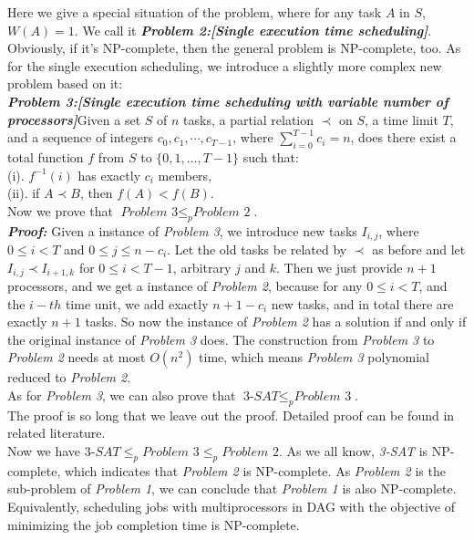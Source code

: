 \documentclass{llncs}
\begin{document}
\indent\setlength{\parindent}{2em}Here we give a special situation of the problem, where for any task $A$ in $S$, $W(A)=1$. We call it
\textbf{\textit{Problem 2:[Single execution time scheduling]}}. Obviously, if it’s NP-complete, then the general problem is NP-complete, too. As for the single execution scheduling, we introduce a slightly more complex new problem based on it:\\
\indent\setlength{\parindent}{2em}\textbf{\textit{Problem 3:[Single execution time scheduling with variable number of processors]}}Given a set $S$ of $n$ tasks, a partial relation $\prec$ on $S$, a time limit $T$, and a sequence of integers $c_0,c_1,\cdots,c_{T-1}$, where $\sum\limits_{i=0}^{T-1}c_i=n$, does there exist a total function $f$ from $S$ to $\{0, 1, ..., T-1\}$ such that:\\
\indent\setlength{\parindent}{2em}(i). $f^{-1}(i)$ has exactly $c_i$ members,\\
\indent\setlength{\parindent}{2em}(ii). if $A\prec B$, then $f(A)<f(B)$.\\
\indent\setlength{\parindent}{2em}Now we prove that $\textit{Problem 3}\leq _p\textit{Problem 2}$.\\
\indent\setlength{\parindent}{2em}\textbf{\textit{Proof: }} Given a instance of \textit{Problem 3}, we introduce new tasks $I_{i,j}$, where $0\leqslant i<T$ and $0\leqslant j\leqslant n-c_i$. Let the old tasks be related by $\prec$ as before and let $I_{i,j}\prec I_{i+1,k}$ for $0\leqslant i<T-1$, arbitrary $j$ and $k$. Then we just provide $n+1$ processors, and we get a instance of \textit{Problem 2}, because for any $0\leqslant i<T$, and the $i-th$ time unit, we add exactly $n+1-c_i$ new tasks, and in total there are exactly $n+1$ tasks. So now the instance of \textit{Problem 2} has a solution if and only if the original instance of \textit{Problem 3} does. The construction from \textit{Problem 3} to \textit{Problem 2} needs at most $O(n^2)$ time, which means \textit{Problem 3} polynomial reduced to \textit{Problem 2}.\\
\indent\setlength{\parindent}{2em}As for \textit{Problem 3}, we can also prove that $\textit{3-SAT}\leq_p\textit{Problem 3}$.\\
\indent\setlength{\parindent}{2em}The proof is so long that we leave out the proof. Detailed proof can be found in related literature\cite{ref_article3}. \\
\indent\setlength{\parindent}{2em}Now we have $\textit{3-SAT}\leq_p\textit{Problem 3}\leq_p\textit{Problem 2}$. As we all know, \textit{3-SAT} is NP-complete, which indicates that \textit{Problem 2} is NP-complete. As \textit{Problem 2} is the sub-problem of \textit{Problem 1}, we can conclude that \textit{Problem 1} is also NP-complete. Equivalently, scheduling jobs with multiprocessors in DAG with the objective of minimizing the job completion time is NP-complete.\\
\end{document}
